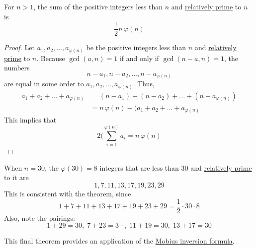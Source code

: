 \documentclass{article}
\newcounter{theorem}[section]
\newcounter{example}[section]
\begin{document}
\begin{theorem}
  \label{thm:sum-of-the-integers-coprime-to-n}
For $n>1$, the sum of the positive integers less than $n$ and \hyperref[def:relatively-prime]{relatively prime} to $n$ is
\begin{equation}
  \frac{1}{2} n \,\varphi(n)
\end{equation}
\end{theorem}
\begin{proof}
Let $a_1, a_2, ..., a_{\varphi(n)}$ be the positive integers less than $n$ and \hyperref[def:relatively-prime]{relatively prime} to $n$. Because $\gcd(a, n) = 1$ if and only if $\gcd(n-a, n) = 1$, the numbers
\begin{equation}
  n-a_1, n-a_2, ..., n - a_{\varphi(n)}
\end{equation}
are equal in some order to $a_1, a_2, ..., a_{\varphi(n)}$. Thus, 
\begin{align*}
    a_1 + a_2 + ... + a_{\varphi(n)} & = (n- a_1) + (n - a_2) + ... + (n - a_{\varphi(n)}) \\
    & = n\,\varphi(n) - (a_1 + a_2 + ... + a_{\varphi(n)}
\end{align*}
This implies that 
\begin{equation}
  2 (\sum_{i=1}^{\varphi(n)} a_i = n\, \varphi(n)
\end{equation}
\end{proof}

\begin{example}
  \label{ex:integers-coprime-to-30}
When $n = 30$, the $\varphi(30) = 8$ integers that are less than $30$ and \hyperref[def:relatively-prime]{relatively prime} to it are
\begin{equation}
  1, 7, 11, 13, 17, 19, 23, 29
\end{equation}
This is consistent with the theorem, since 
\begin{equation}
  1+7+11+13+17+19+23+29=\frac{1}{2} \cdot 30 \cdot 8
\end{equation}
Also, note the pairings: 
\begin{equation}
  1+29=30, \; 7+23=3-, \; 11+19=30, \; 13+17=30
\end{equation}
\end{example}

This final theorem provides an application of the \hyperref[thm:mobius-inversion-formula]{Mobius inversion formula}. 
\end{document}

